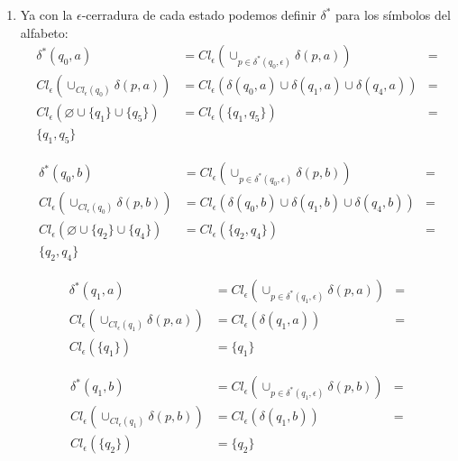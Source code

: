 \documentclass{article}
\begin{document}
\begin{enumerate}
{\begin{enumerate}
{				}
				
				\item{
					Ya con la $\epsilon$-cerradura de cada estado podemos definir $\delta^{*}$ para los símbolos del alfabeto:\\
					
					\begin{align*}
						\delta^{*} (q_{0},a)&=
						Cl_{\epsilon} (\cup_{p \in \delta^{*} (q_{0}, \epsilon)}	\delta (p,a)) &=\\
						Cl_{\epsilon} (\cup_{Cl_{\epsilon} (q_{0})}	\delta (p,a)) &=
						Cl_{\epsilon} ( \delta(q_{0},a) \cup \delta(q_{1},a) \cup \delta(q_{4},a)) &=\\
						Cl_{\epsilon} ( \varnothing \cup \{q_{1}\} \cup \{q_{5}\}) &=
						Cl_{\epsilon} (\{q_{1}, q_{5}\}) &=\\
						\{q_{1}, q_{5}\}
					\end{align*}
					
					\begin{align*}
					\delta^{*} (q_{0},b)&=
					Cl_{\epsilon} (\cup_{p \in \delta^{*} (q_{0}, \epsilon)}	\delta (p,b)) &=\\
					Cl_{\epsilon} (\cup_{Cl_{\epsilon} (q_{0})}	\delta (p,b)) &=
					Cl_{\epsilon} ( \delta(q_{0},b) \cup \delta(q_{1},b) \cup \delta(q_{4},b)) &=\\
					Cl_{\epsilon} ( \varnothing \cup \{q_{2}\} \cup \{q_{4}\}) &=
					Cl_{\epsilon} (\{q_{2}, q_{4}\}) &=\\
					\{q_{2}, q_{4}\}
					\end{align*}
				
					\begin{align*}
					\delta^{*} (q_{1},a)&=
					Cl_{\epsilon} (\cup_{p \in \delta^{*} (q_{1}, \epsilon)}	\delta (p,a)) &=\\
					Cl_{\epsilon} (\cup_{Cl_{\epsilon} (q_{1})}	\delta (p,a)) &=
					Cl_{\epsilon} ( \delta(q_{1},a)) &=\\
					Cl_{\epsilon} (\{q_{1}\}) &=
					\{q_{1}\}
					\end{align*}
					
					\begin{align*}
					\delta^{*} (q_{1},b)&=
					Cl_{\epsilon} (\cup_{p \in \delta^{*} (q_{1}, \epsilon)}	\delta (p,b)) &=\\
					Cl_{\epsilon} (\cup_{Cl_{\epsilon} (q_{1})}	\delta (p,b)) &=
					Cl_{\epsilon} ( \delta(q_{1},b)) &=\\
					Cl_{\epsilon} (\{q_{2}\}) &=
					\{q_{2}\}
					\end{align*}
					
}
\end{enumerate}}
\end{enumerate}
\end{document}
